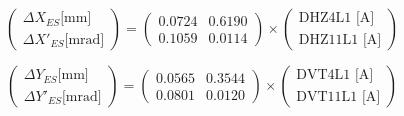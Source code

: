 \documentclass[11pt,letter,english]{article}
\begin{document}
\begin{equation}
\left( \begin{array}{c}
\Delta X_{ES}  \mbox{[mm]}   \\
\Delta X'_{ES} \mbox{[mrad]} \end{array} \right) 
=
\left( \begin{array}{cc}
0.0724 & 0.6190   \\
0.1059 & 0.0114  \end{array} \right) 
\times
\left( \begin{array}{c}
\mbox{DHZ4L1 [A]}   \\
\mbox{DHZ11L1 [A]}  \end{array} \right) 
\end{equation}

\begin{equation}
\left( \begin{array}{c}
\Delta Y_{ES}  \mbox{[mm]}   \\
\Delta Y'_{ES} \mbox{[mrad]} \end{array} \right) 
=
\left( \begin{array}{cc}
0.0565 & 0.3544   \\
0.0801 & 0.0120  \end{array} \right) 
\times
\left( \begin{array}{c}
\mbox{DVT4L1 [A]}   \\
\mbox{DVT11L1 [A]}  \end{array} \right) 
\end{equation}
\end{document}

